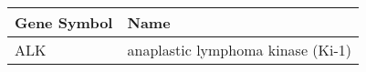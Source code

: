 \begin{tabular}{ll}
\toprule
Gene Symbol &                              Name \\
\midrule
        ALK & anaplastic lymphoma kinase (Ki-1) \\
\bottomrule
\end{tabular}
